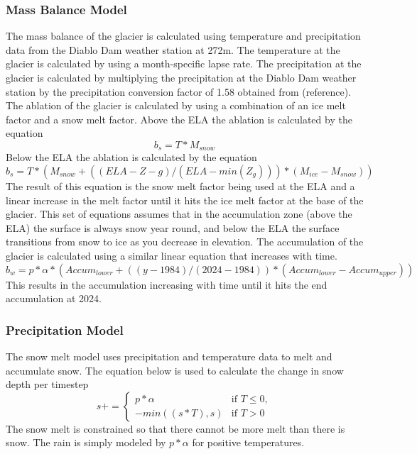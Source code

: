 \documentclass{article}
\begin{document}
\subsubsection{Mass Balance Model}
The mass balance of the glacier is calculated using temperature and precipitation data from the Diablo Dam weather station at 272m. The 
temperature at the glacier is calculated by using a month-specific lapse rate. 
The precipitation at the glacier is calculated by multiplying the precipitation at the Diablo Dam weather station by the precipitation conversion factor of 1.58 
obtained from (reference). The ablation of the glacier is calculated by using a combination of an ice melt factor and a snow melt factor. Above the ELA the 
ablation is calculated by the equation
\begin{equation}b_s=T*M_{snow}\end{equation}
Below the ELA the ablation is calculated by the equation
\begin{equation}b_s=T*(M_{snow}+((ELA-Z-g)/(ELA-min(Z_g)))*(M_{ice}-M_{snow}))\end{equation}
The result of this equation is the snow melt factor being used at the ELA and a linear increase in the melt factor until it hits the ice melt 
factor at the base of the glacier. This set of equations assumes that in the accumulation zone (above the ELA) the surface is always snow year 
round, and below the ELA the surface transitions from snow to ice as you decrease in elevation.
The accumulation of the glacier is calculated using a similar linear equation that increases with time.
\begin{equation}b_w=p*\alpha*({Accum}_{lower}+((y-1984)/(2024-1984))*({Accum}_{lower}-{Accum}_{upper}))\end{equation}
This results in the accumulation increasing with time until it hits the end accumulation at 2024. 

\subsubsection{Precipitation Model}
The snow melt model uses precipitation and temperature data to melt and accumulate snow. 
The equation below is used to calculate the change in snow depth per timestep 
\begin{equation}s += 
\begin{cases} 
  p*\alpha & \text{if } T \leq 0,\\
  -min((s*T),s) & \text{if } T > 0
\end{cases}\end{equation}
The snow melt is constrained so that there cannot be more melt than there is snow. The rain is simply modeled by $p*\alpha$ for positive 
temperatures.
\end{document}
